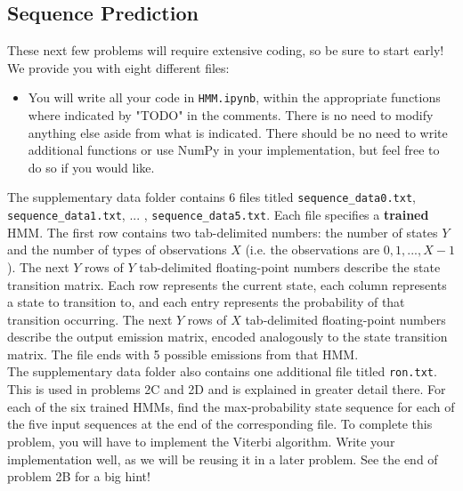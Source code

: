 \subsection{Sequence Prediction}

These next few problems will require extensive coding, so be sure to start early! We provide you with eight different files:
\begin{itemize}
  \item You will write all your code in \texttt{HMM.ipynb}, within the appropriate functions where indicated by "TODO" in the comments. There is no need to modify anything else aside from what is indicated. There should be no need to write additional functions or use NumPy in your implementation, but feel free to do so if you would like. 
\end{itemize}

The supplementary data folder contains 6 files titled \texttt{sequence_data0.txt}, \texttt{sequence_data1.txt}, ... , \texttt{sequence_data5.txt}. Each file specifies a \textbf{trained} HMM. The first row contains two tab-delimited numbers: the number of states $Y$ and the number of types of observations $X$ (i.e. the observations are $0, 1, . . . , X - 1$). The next $Y$ rows of $Y$ tab-delimited floating-point numbers describe the state transition matrix. Each row represents the current state, each column represents a state to transition to, and each entry represents the probability of that transition occurring. The next $Y$ rows of $X$ tab-delimited floating-point numbers describe the output emission matrix, encoded analogously to the state transition matrix. The file ends with 5 possible emissions from that HMM. \\

The supplementary data folder also contains one additional file titled \texttt{ron.txt}. This is used in problems 2C and 2D and is explained in greater detail there. 
\indent\problem[10] %
For each of the six trained HMMs, find the max-probability state sequence for each of the five input sequences at the end of the corresponding file. To complete this problem, you will have to implement the Viterbi algorithm. Write your implementation well, as we will be reusing it in a later problem. See the end of problem 2B for a big hint!


